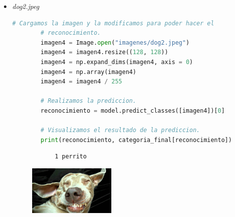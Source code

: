 \documentclass[letterpaper,11pt]{article}
\begin{document}
\begin{enumerate}
\begin{itemize}
        \item \textit{dog2.jpeg}
        \begin{lstlisting}[language=Python]
        # Cargamos la imagen y la modificamos para poder hacer el 
        # reconocimiento.
        imagen4 = Image.open("imagenes/dog2.jpeg")
        imagen4 = imagen4.resize((128, 128))
        imagen4 = np.expand_dims(imagen4, axis = 0)
        imagen4 = np.array(imagen4)
        imagen4 = imagen4 / 255

        # Realizamos la prediccion.
        reconocimiento = model.predict_classes([imagen4])[0]

        # Visualizamos el resultado de la prediccion.
        print(reconocimiento, categoria_final[reconocimiento])
        \end{lstlisting}

        \begin{verbatim}
            1 perrito 
        \end{verbatim}

        \begin{figure}[ht]
            \centering
            \includegraphics[width=0.4\textwidth]{./src/imagenes/dog2.jpeg}
        \end{figure} 
    \end{itemize}
\end{enumerate}
\end{document}
